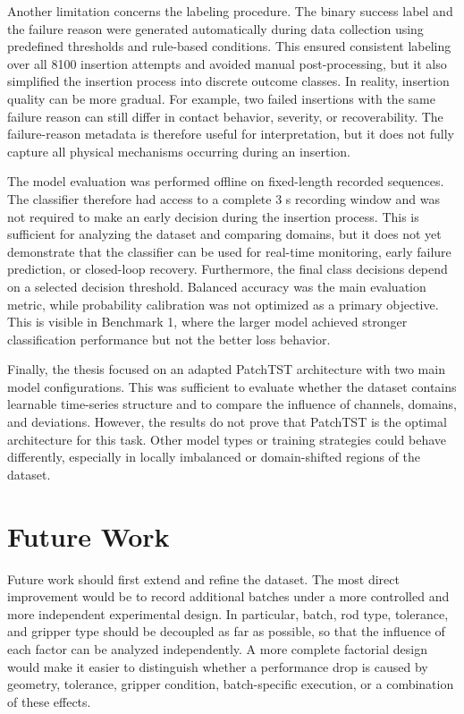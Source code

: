 Another limitation concerns the labeling procedure. The binary success label and the failure reason were generated automatically during data collection using predefined thresholds and rule-based conditions. This ensured consistent labeling over all 8100 insertion attempts and avoided manual post-processing, but it also simplified the insertion process into discrete outcome classes. In reality, insertion quality can be more gradual. For example, two failed insertions with the same failure reason can still differ in contact behavior, severity, or recoverability. The failure-reason metadata is therefore useful for interpretation, but it does not fully capture all physical mechanisms occurring during an insertion.

The model evaluation was performed offline on fixed-length recorded sequences. The classifier therefore had access to a complete 3 s recording window and was not required to make an early decision during the insertion process. This is sufficient for analyzing the dataset and comparing domains, but it does not yet demonstrate that the classifier can be used for real-time monitoring, early failure prediction, or closed-loop recovery. Furthermore, the final class decisions depend on a selected decision threshold. Balanced accuracy was the main evaluation metric, while probability calibration was not optimized as a primary objective. This is visible in Benchmark 1, where the larger model achieved stronger classification performance but not the better loss behavior.

Finally, the thesis focused on an adapted PatchTST architecture with two main model configurations. This was sufficient to evaluate whether the dataset contains learnable time-series structure and to compare the influence of channels, domains, and deviations. However, the results do not prove that PatchTST is the optimal architecture for this task. Other model types or training strategies could behave differently, especially in locally imbalanced or domain-shifted regions of the dataset.

\section{Future Work}
\label{sec:future_work}

Future work should first extend and refine the dataset. The most direct improvement would be to record additional batches under a more controlled and more independent experimental design. In particular, batch, rod type, tolerance, and gripper type should be decoupled as far as possible, so that the influence of each factor can be analyzed independently. A more complete factorial design would make it easier to distinguish whether a performance drop is caused by geometry, tolerance, gripper condition, batch-specific execution, or a combination of these effects.

